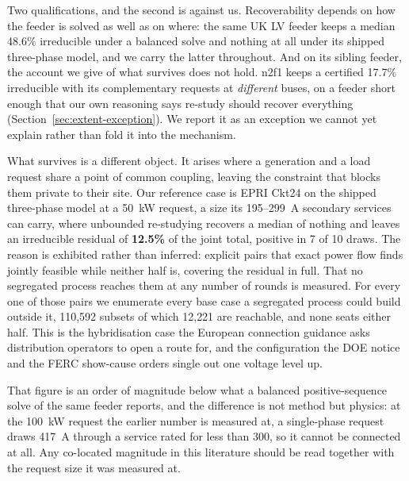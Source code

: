 \documentclass[review,authoryear,12pt]{elsarticle}
\begin{document}
Two qualifications, and the second is against us. Recoverability depends on how
the feeder is solved as well as on where: the same UK LV feeder keeps a median
48.6\% irreducible under a balanced solve and nothing at all under its shipped
three-phase model, and we carry the latter throughout. And on its sibling
feeder, the account we give of what survives does not hold. n2f1 keeps a
certified 17.7\% irreducible with its complementary requests at
\emph{different} buses, on a feeder short enough that our own reasoning says
re-study should recover everything (Section~\ref{sec:extent-exception}). We
report it as an exception we cannot yet explain rather than fold it into the
mechanism.

What survives is a different object. It arises where a generation and a load
request share a point of common coupling, leaving the constraint that blocks
them private to their site. Our reference case is EPRI Ckt24 on the shipped
three-phase model at a 50~kW request, a size its 195--299~A secondary
services can carry, where unbounded re-studying recovers a median of
nothing and leaves an irreducible residual of \textbf{12.5\%} of the joint
total, positive in 7 of 10 draws. The reason is exhibited rather than inferred:
explicit pairs that exact power flow finds jointly feasible while neither half
is, covering the residual in full. That no segregated process reaches them at
any number of rounds is measured. For every one of those pairs we enumerate
every base case a segregated process could build outside it, 110{,}592 subsets
of which 12{,}221 are reachable, and none seats either half. This is the
hybridisation case the European connection
guidance asks distribution operators to open a route for, and the configuration
the DOE notice and the FERC show-cause orders single out one voltage level up.

That figure is an order of magnitude below what a balanced positive-sequence
solve of the same feeder reports, and the difference is not method but
physics: at the 100~kW request the earlier number is measured at, a
single-phase request draws 417~A through a service rated for less than 300, so
it cannot be connected at all. Any co-located magnitude in this literature
should be read together with the request size it was measured at.
\end{document}
